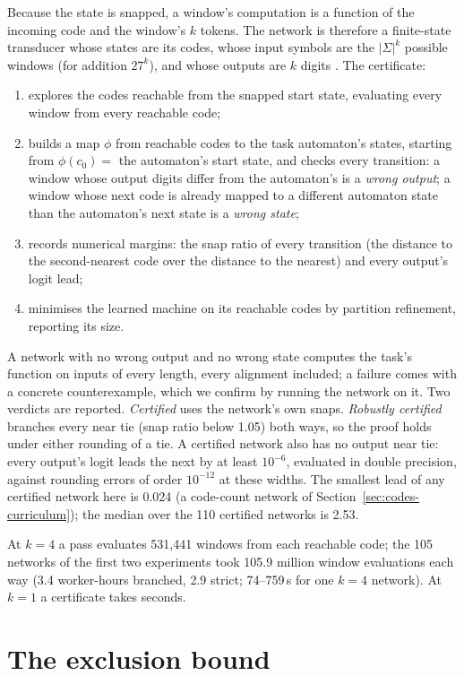 \documentclass[11pt]{article}
\begin{document}
Because the state is snapped, a window's computation is a function of the incoming code and the
window's $k$ tokens. The network is therefore a finite-state transducer whose states are its codes,
whose input symbols are the $|\Sigma|^k$ possible windows (for addition $27^k$), and whose outputs
are $k$ digits \citep{mealy-1955-synthesizing}. The certificate:
\begin{enumerate}
\item explores the codes reachable from the snapped start state, evaluating every window from every
  reachable code;
\item builds a map $\phi$ from reachable codes to the task automaton's states, starting from
  $\phi(c_0) = $ the automaton's start state, and checks every transition: a window whose output
  digits differ from the automaton's is a \emph{wrong output}; a window whose next code is already
  mapped to a different automaton state than the automaton's next state is a \emph{wrong state};
\item records numerical margins: the snap ratio of every transition (the distance to the
  second-nearest code over the distance to the nearest) and every output's logit lead;
\item minimises the learned machine on its reachable codes by partition refinement, reporting its
  size.
\end{enumerate}
A network with no wrong output and no wrong state computes the task's function on inputs of every
length, every alignment included; a failure comes with a concrete counterexample, which we confirm
by running the network on it. Two verdicts are reported. \emph{Certified} uses the network's own
snaps. \emph{Robustly certified} branches every near tie (snap ratio below 1.05) both ways, so the
proof holds under either rounding of a tie. A certified network also has no output near tie: every
output's logit leads the next by at least $10^{-6}$, evaluated in double precision, against rounding
errors of order $10^{-12}$ at these widths. The smallest lead of any certified network here is
0.024 (a code-count network of Section~\ref{sec:codes-curriculum}); the median over the 110
certified networks is 2.53.

At $k=4$ a pass evaluates 531{,}441 windows from each reachable code; the 105 networks of the first
two experiments took 105.9 million window evaluations each way (3.4 worker-hours branched, 2.9
strict; 74--759\,s for one $k=4$ network). At $k=1$ a certificate takes seconds.

\section{The exclusion bound}
\label{sec:bound}
\end{document}

